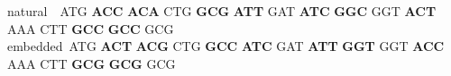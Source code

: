 \ttfamily natural\ \ ATG \textcolor{leak}{\textbf{ACC}} \textcolor{leak}{\textbf{ACA}} CTG \textcolor{leak}{\textbf{GCG}} \textcolor{leak}{\textbf{ATT}} GAT \textcolor{leak}{\textbf{ATC}} \textcolor{leak}{\textbf{GGC}} GGT \textcolor{leak}{\textbf{ACT}} AAA CTT \textcolor{leak}{\textbf{GCC}} \textcolor{leak}{\textbf{GCC}} GCG\\
\ttfamily embedded\ ATG \textcolor{leak}{\textbf{ACT}} \textcolor{leak}{\textbf{ACG}} CTG \textcolor{leak}{\textbf{GCC}} \textcolor{leak}{\textbf{ATC}} GAT \textcolor{leak}{\textbf{ATT}} \textcolor{leak}{\textbf{GGT}} GGT \textcolor{leak}{\textbf{ACC}} AAA CTT \textcolor{leak}{\textbf{GCG}} \textcolor{leak}{\textbf{GCG}} GCG\\

